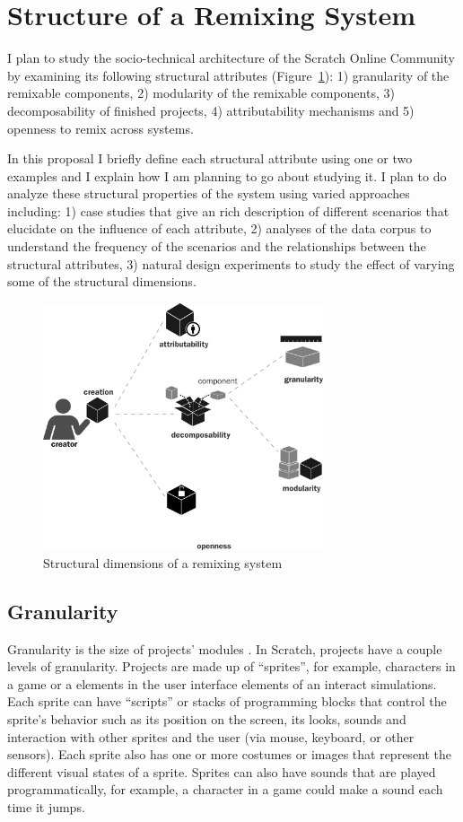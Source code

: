 \section{Structure of a Remixing System} 
I plan to study the socio-technical architecture of the Scratch Online Community by examining its following structural attributes (Figure~\ref{fig:structure}):
1) granularity of the remixable components, 
2) modularity of the remixable components, 
3) decomposability of finished projects, 
4) attributability mechanisms and 
5) openness to remix across systems.

In this proposal I briefly define each structural attribute using one or two examples and I explain how I am planning to go about studying it.
I plan to do analyze these structural properties of the system using varied approaches including:
1) case studies that give an rich description of different scenarios that elucidate on the influence of each attribute,
2) analyses of  the data corpus to understand the frequency of the scenarios and the relationships between the structural attributes,
3) natural design experiments to study the effect of varying some of the structural dimensions.

\begin{figure} 
\centering
\includegraphics[width=3.25in]{figures/structure.pdf}
\caption{Structural dimensions of a remixing system}
\label{fig:structure}
\end{figure}

\subsection{Granularity}
Granularity is the size of projects' modules \citet{benkler_coases_2002}. 
In Scratch, projects have a couple levels of granularity.
Projects are made up of ``sprites'', for example, characters in a game or a elements in the user interface elements of an interact simulations.
Each sprite can have ``scripts'' or  stacks of programming blocks that control the sprite's behavior such as its position on the screen, its looks, sounds and interaction with other sprites and the user (via mouse, keyboard, or other sensors).
Each sprite also has one or more costumes or images that represent the different visual states of a sprite.
Sprites can also have sounds that are played programmatically, for example, a character in a game could make a sound each time it jumps.

